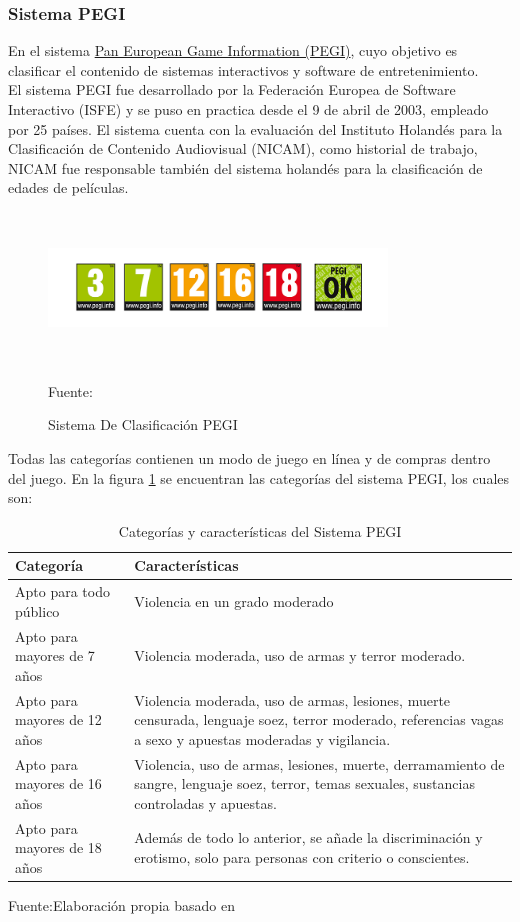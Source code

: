 \subsubsection{Sistema PEGI}

En el sistema \href{https://pegi.info/es}{Pan European Game Information (PEGI)}, cuyo objetivo es clasificar el contenido de sistemas interactivos y software de entretenimiento. 
\\
El sistema PEGI fue desarrollado por la Federación Europea de Software Interactivo (ISFE) y se puso en practica desde el 9 de abril de 2003, empleado por 25 países. El sistema cuenta con la evaluación del Instituto Holandés para la Clasificación de Contenido Audiovisual (NICAM), como historial de trabajo, NICAM fue responsable también del sistema holandés para la clasificación de edades de películas.

\begin{figure}[t!]
	\centering
	\includegraphics[width=9cm,height=4cm,]{./Images/pegi.png}
	\caption{Sistema De Clasificación PEGI}
	\footnotesize Fuente: \cite{pegi}
	\label{pegi}
\end{figure}
Todas las categorías contienen un modo de juego en línea y de compras dentro del juego. En la figura \ref{pegi} se encuentran las categorías del sistema PEGI, los cuales son:
\begin{table}[t]
	\begin{center}
		\begin{tabular}{| m{5cm} | m{10cm} | }
			\hline Categoría & Características \\ \hline
			Apto para todo público & Violencia en un grado moderado \\ \hline
			Apto para mayores de 7 años & Violencia moderada, uso de armas y terror moderado. \\ \hline
			Apto para mayores de 12 años & Violencia moderada, uso de armas, lesiones,
			muerte censurada, lenguaje soez, terror moderado, referencias vagas a sexo y
			apuestas moderadas y vigilancia. \\ \hline
			Apto para mayores de 16 años & Violencia, uso de armas, lesiones, muerte, derramamiento de sangre, lenguaje soez, terror, temas sexuales, sustancias controladas
			y apuestas.
\\ \hline
			Apto para mayores de 18 años & Además de todo lo anterior, se añade la discriminación y
			erotismo, solo para personas con criterio o conscientes. \\ \hline
		\end{tabular}
		\caption{Categorías y características del Sistema PEGI}
		\footnotesize Fuente:Elaboración propia basado en \cite{pegi}
	\end{center}
\end{table}



